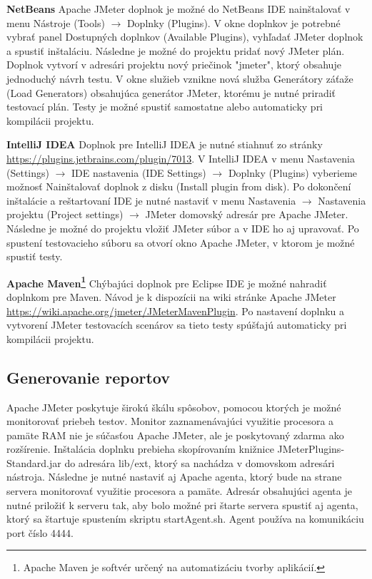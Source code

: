 \documentclass[12pt,oneside,final]{fithesis-utf8}
\begin{document}
\noindent\textbf{NetBeans}
\newline
Apache JMeter doplnok je možné do NetBeans IDE nainštalovať v menu Nástroje (Tools) $\rightarrow$ Doplnky (Plugins). V okne doplnkov je potrebné vybrať panel Dostupných doplnkov (Available Plugins), vyhľadať JMeter doplnok a spustiť inštaláciu. Následne je možné do projektu pridať nový JMeter plán. Doplnok vytvorí v adresári projektu nový priečinok "jmeter", ktorý obsahuje jednoduchý návrh testu. V okne služieb vznikne nová služba Generátory záťaže (Load Generators) obsahujúca generátor JMeter, ktorému je nutné priradiť testovací plán. Testy je možné spustiť samostatne alebo automaticky pri kompilácii projektu.
\newline

\noindent\textbf{IntelliJ IDEA}
\newline
Doplnok pre IntelliJ IDEA je nutné stiahnuť zo stránky \url{https://plugins.jetbrains.com/plugin/7013}.  V IntelliJ IDEA v menu Nastavenia (Settings) $\rightarrow$ IDE nastavenia (IDE Settings) $\rightarrow$ Doplnky (Plugins) vyberieme možnosť Nainštalovať doplnok z disku (Install plugin from disk). Po dokončení inštalácie a reštartovaní IDE je nutné nastaviť v menu Nastavenia $\rightarrow$ Nastavenia projektu (Project settings) $\rightarrow$ JMeter domovský adresár pre Apache JMeter. Následne je možné do projektu vložiť JMeter súbor a v IDE ho aj upravovať. Po spustení testovacieho súboru sa otvorí okno Apache JMeter, v ktorom je možné spustiť testy.
\newline

\newpage
\noindent\textbf{Apache Maven\footnote{Apache Maven je softvér určený na automatizáciu tvorby aplikácií.}}
\newline
Chýbajúci doplnok pre Eclipse IDE je možné nahradiť doplnkom pre Maven. Návod je k dispozícii na wiki stránke Apache JMeter \url{https://wiki.apache.org/jmeter/JMeterMavenPlugin}. Po nastavení doplnku a vytvorení JMeter testovacích scenárov sa tieto testy spúšťajú automaticky pri kompilácii projektu.

\subsection{Generovanie reportov}
Apache JMeter poskytuje širokú škálu spôsobov, pomocou ktorých je možné monitorovať priebeh testov. Monitor zaznamenávajúci využitie procesora a pamäte RAM nie je súčasťou Apache JMeter, ale je poskytovaný zdarma ako rozšírenie. Inštalácia doplnku prebieha skopírovaním knižnice JMeterPlugins-Standard.jar do adresára lib/ext, ktorý sa nachádza v domovskom adresári nástroja. Následne je nutné nastaviť aj Apache agenta, ktorý bude na strane servera monitorovať využitie procesora a pamäte. Adresár obsahujúci agenta je nutné priložiť k serveru tak, aby bolo možné pri štarte servera spustiť aj agenta, ktorý sa štartuje spustením skriptu startAgent.sh. Agent používa na komunikáciu port číslo 4444.
\end{document}
